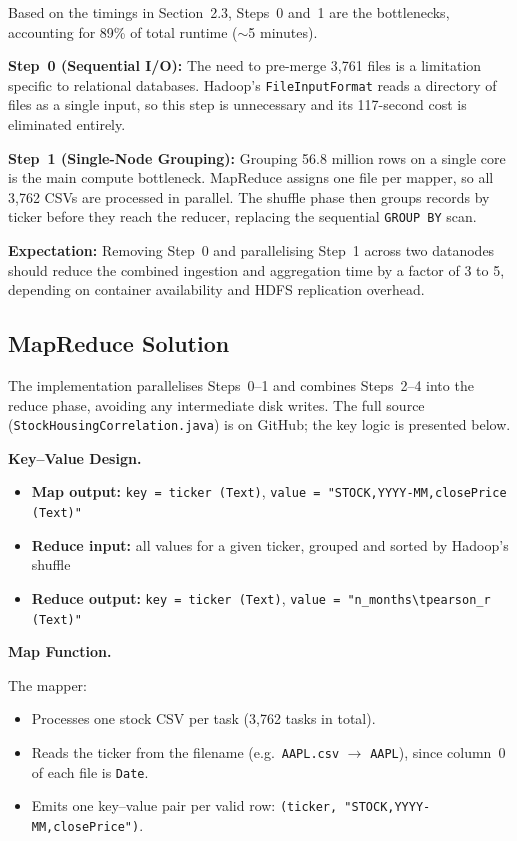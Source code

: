 \documentclass[11pt]{article}
\begin{document}
Based on the timings in Section~2.3, Steps~0 and~1 are the bottlenecks, accounting for 89\% of total runtime ($\sim$5 minutes).

\textbf{Step~0 (Sequential I/O):} The need to pre-merge 3,761 files is a limitation specific to relational databases. Hadoop's \texttt{FileInputFormat} reads a directory of files as a single input, so this step is unnecessary and its 117-second cost is eliminated entirely.

\textbf{Step~1 (Single-Node Grouping):} Grouping 56.8 million rows on a single core is the main compute bottleneck. MapReduce assigns one file per mapper, so all 3,762 CSVs are processed in parallel. The shuffle phase then groups records by ticker before they reach the reducer, replacing the sequential \texttt{GROUP BY} scan.

\textbf{Expectation:} Removing Step~0 and parallelising Step~1 across two datanodes should reduce the combined ingestion and aggregation time by a factor of 3 to 5, depending on container availability and HDFS replication overhead.

\subsection{MapReduce Solution}

The implementation parallelises Steps~0--1 and combines Steps~2--4 into the reduce phase, avoiding any intermediate disk writes. The full source (\texttt{StockHousingCorrelation.java}) is on GitHub; the key logic is presented below.

\textbf{Key--Value Design.}
\begin{itemize}
  \item \textbf{Map output:} \texttt{key = ticker (Text)}, \texttt{value = "STOCK,YYYY-MM,closePrice (Text)"}
  \item \textbf{Reduce input:} all values for a given ticker, grouped and sorted by Hadoop's shuffle
  \item \textbf{Reduce output:} \texttt{key = ticker (Text)}, \texttt{value = "n\_months\textbackslash tpearson\_r (Text)"}
\end{itemize}

\textbf{Map Function.}

The mapper:
\begin{itemize}
  \item Processes one stock CSV per task (3,762 tasks in total).
  \item Reads the ticker from the filename (e.g.\ \texttt{AAPL.csv} $\to$ \texttt{AAPL}), since column~0 of each file is \texttt{Date}.
  \item Emits one key--value pair per valid row: \texttt{(ticker, "STOCK,YYYY-MM,closePrice")}.
\end{itemize}
\end{document}
